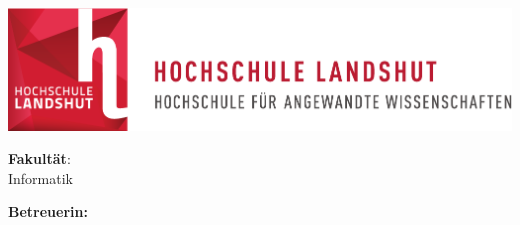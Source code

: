 
\thispagestyle{empty}

\begin{titlepage}
  
\begin{flushleft}
	\includegraphics[scale=0.8]{0-Template/Logo.pdf}
\end{flushleft}

\vspace{2cm}

\begin{center}
	{\fontsize{30}{60}\selectfont \textbf{\batitle}}
  
	\large \vorname{} \name{}
\end{center}

\vspace{6cm}

\begin{flushleft}
	\Large \textbf{\thesis}
  
  \vspace{2cm}
  
	\large \textbf{Fakultät}:\\
  \normalsize Informatik\\
  
  \vspace{0.5cm}
  
  \large \textbf{Betreuerin:}\\
  \normalsize \babetreuer
\end{flushleft}

\end{titlepage}